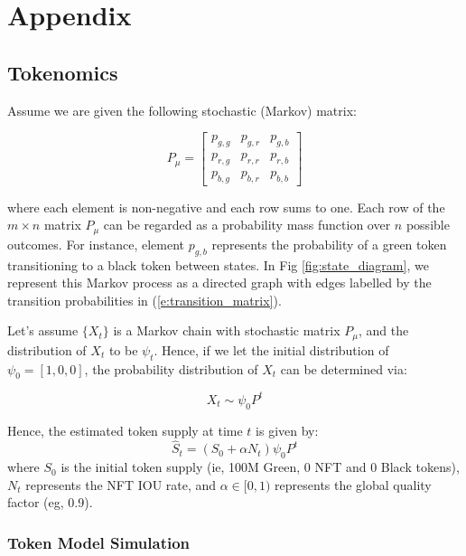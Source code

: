 \documentclass{article}
\begin{document}
\section{Appendix}

\subsection{Tokenomics}
\label{section:tokenomics}

Assume we are given the following stochastic (Markov) matrix:

\begin{equation}
P_{\mu}  = 
\begin{bmatrix}
p_{g,g} & p_{g,r}  & p_{g,b} \\
p_{r,g} & p_{r,r}  & p_{r,b} \\
p_{b,g} & p_{b,r} & p_{b,b} 
\end{bmatrix}
\label{e:transition_matrix}
\end{equation}

where each element is non-negative and each row sums to one. Each row of the $m \times n$ matrix $P_{\mu}$ can be regarded as a probability mass function over $n$ possible outcomes. For instance, element $p_{g,b}$ represents the probability of a green token transitioning to a black token between states. In Fig \ref{fig:state_diagram}, we represent this Markov process as a directed graph with edges labelled by the transition probabilities in (\ref{e:transition_matrix}).

Let's assume $\{X_{t}\}$ is a Markov chain with stochastic matrix $P_{\mu}$, and the distribution of $X_{t}$ to be $\psi_{t}$. Hence, if we let the initial distribution of $\psi_{0} = [1,0,0]$, the probability distribution of $X_{t}$ can be determined via:

\begin{equation}
X_{t} \sim \psi_{0}P^{t}
\label{e:pow_vs_pos}
\end{equation}

Hence, the estimated token supply at time $t$ is given by:
\begin{equation}
\hat{S}_{t} = (S_{0} + \alpha N_{t})\psi_{0}P^{t}
\label{e:token_supply}
\end{equation}
where $S_{0}$ is the initial token supply (ie, 100M Green, 0 NFT and 0 Black tokens), $N_{t}$ represents the NFT IOU rate, and $\alpha \in [0,1)$ represents the global quality factor (eg, 0.9).

\subsubsection{Token Model Simulation}
\end{document}
